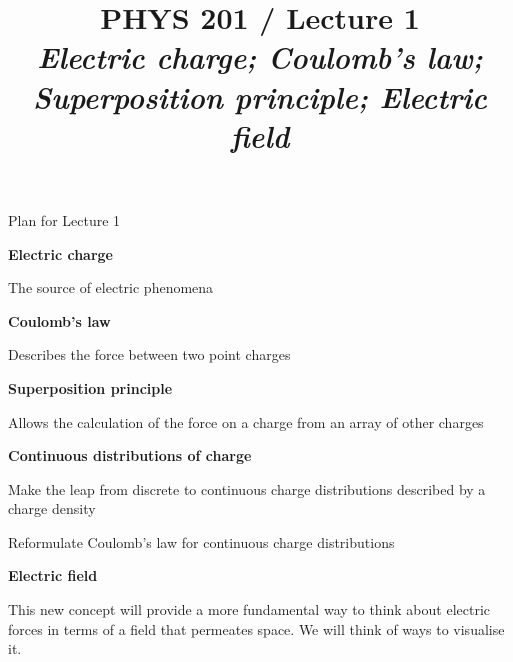 \renewcommand{\prevlecture}{0 }
\renewcommand{\thislecture}{1 }
\renewcommand{\nextlecture}{2 }

%
%

\title[PHYS 201 / Lecture \thislecture]
{
  PHYS 201 / Lecture \thislecture \\
  {\it Electric charge; Coulomb's law; Superposition principle; Electric field}\\
}



\begin{frame}[plain]
  \titlepage
\end{frame}



%
%
%

\begin{frame}{Plan for Lecture \thislecture}

\begin{itemize}
{\small
\item {\bf Electric charge}
  \begin{itemize}
  {\scriptsize
    \item The source of electric phenomena
  }
  \end{itemize}

\item {\bf Coulomb's law}
  \begin{itemize}
  {\scriptsize
     \item Describes the force between two point charges
  }
  \end{itemize}

\item {\bf Superposition principle}
  \begin{itemize}
  {\scriptsize
     \item Allows the calculation of the force on a charge from an array of other charges
  }
  \end{itemize}

\item {\bf Continuous distributions of charge}
  \begin{itemize}
  {\scriptsize
    \item Make the leap from discrete to continuous charge distributions described by a charge density
    \item Reformulate Coulomb's law for continuous charge distributions
  }
  \end{itemize}

\item {\bf Electric field}
  \begin{itemize}
  {\scriptsize
     \item This new concept will provide a more fundamental way to think about electric forces
           in terms of a field that permeates space. We will think of ways to visualise it.
  }
  \end{itemize}

}
\end{itemize}

\end{frame}

